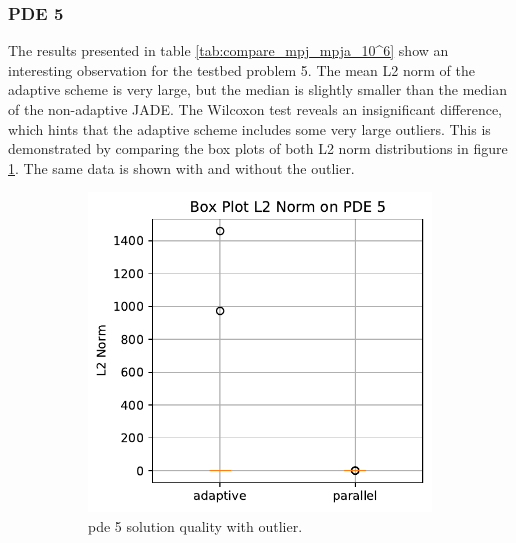\documentclass[./\jobname.tex]{subfiles}
\begin{document}
\subsubsection{PDE 5}
The results presented in table \ref{tab:compare_mpj_mpja_10^6} show an interesting observation for the testbed problem 5. The mean L2 norm of the adaptive scheme is very large, but the median is slightly smaller than the median of the non-adaptive JADE. The Wilcoxon test reveals an insignificant difference, which hints that the adaptive scheme includes some very large outliers. This is demonstrated by comparing the box plots of both L2 norm distributions in figure \ref{fig:paJADE_pde5_l2norm_boxplot}. The same data is shown with and without the outlier. 
\begin{figure}[h]
	\centering
	\begin{subfigure}[b]{0.4\linewidth}
		\centering
		\includegraphics[width=1\textwidth]{../../code/experiments/experiment_2/pde5_L2_norm_boxplot.pdf}
		\caption{\gls{pde} 5 solution quality with outlier. }
		\label{fig:paJADE_pde5_l2norm_boxplot}
	\end{subfigure}%
	\begin{subfigure}[b]{0.39\linewidth}
		\centering

\end{subfigure}
\end{figure}
\end{document}
